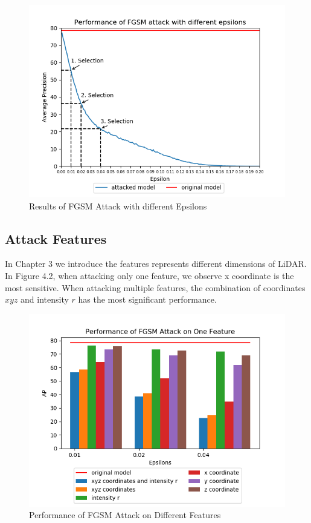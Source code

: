 \begin{figure}[!htbp]
\centering
\includegraphics[scale=0.9]{Graphics/Select Epsilons.png}
\caption{Results of FGSM Attack with different Epsilons}
\label{fig:Select Epsilons}
\end{figure}

\subsection{Attack Features}
In Chapter 3 we introduce the features represents different dimensions of LiDAR. In Figure 4.2, when attacking only one feature, we observe x coordinate is the most sensitive. When attacking multiple features, the combination of coordinates \(xyz\) and intensity \(r\) has the most significant performance.
\begin{figure}[!htbp]
\centering
\includegraphics[scale=0.9]{Graphics/Attack Features.png}
\caption{Performance of FGSM Attack on Different Features}
\label{fig:Attack Features}
\end{figure}


